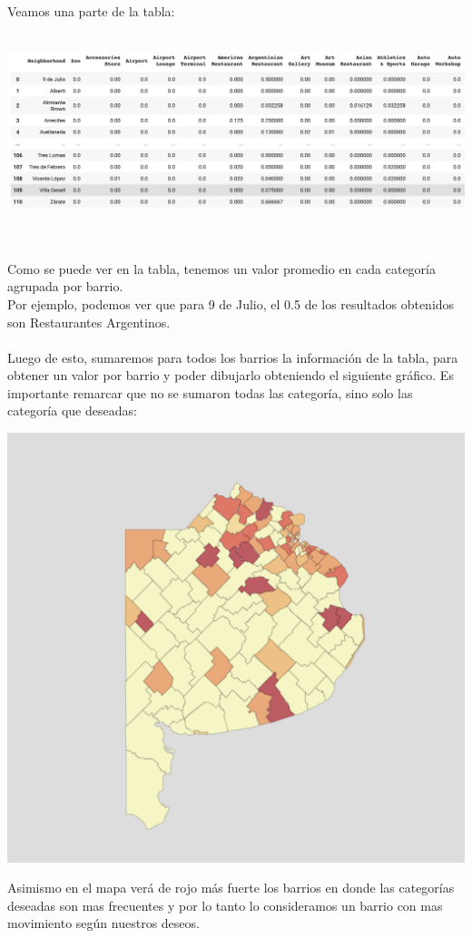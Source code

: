 \documentclass[12pt,a4paper]{tesis}
\begin{document}
Veamos una parte de la tabla:\\ \\
\centerline{
	\includegraphics[scale=0.4]{tabla2}
}
\\ \\
Como se puede ver en la tabla, tenemos un valor promedio en cada categoría agrupada por barrio.\\
Por ejemplo, podemos ver que para 9 de Julio, el 0.5 de los resultados obtenidos son Restaurantes Argentinos.\\
\\
Luego de esto, sumaremos para todos los barrios la información de la tabla, para obtener un valor por barrio y poder dibujarlo obteniendo el siguiente gráfico. Es importante remarcar que no se sumaron todas las categoría, sino solo las categoría que deseadas:

\centerline{
	\includegraphics[scale=0.8]{mapa4}
}

Asimismo en el mapa verá de rojo más fuerte los barrios en donde las categorías deseadas son mas frecuentes y por lo tanto lo consideramos un barrio con mas movimiento según nuestros deseos. \\
\end{document}
